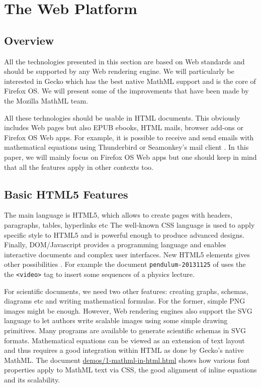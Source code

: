 \section{The Web Platform}

\subsection{Overview}

All the technologies presented in this section are based on Web standards and
should be supported by any Web rendering engine. We will particularly be
interested in Gecko which has the best native MathML support and is the core
of Firefox OS. We will present some of the improvements that have been made
by the Mozilla MathML team.

All these technologies should be usable in HTML documents. This obviously
includes Web pages but also EPUB ebooks, HTML mails, browser add-ons or
Firefox OS Web apps. For example, it is possible to receive and send emails
with mathematical equations using Thunderbird or Seamonkey's mail client
\cite{MathInEmails}.
In this paper, we will mainly
focus on Firefox OS Web apps but one should keep in mind that all the features
apply in other contexts too.

\subsection{Basic HTML5 Features}
\label{sec:basic}

The main language is HTML5, which allows to create pages with headers,
paragraphs, tables, hyperlinks etc The well-known CSS language is used to
apply specific style to HTML5 and is powerful enough to produce advanced
designs. Finally, DOM/Javascript provides a programming language and enables
interactive documents and complex user interfaces. New HTML5 elements
gives other possibilities . For example the document
{\tt pendulum-20131125} of \cite{MathInEbooks} uses the
the {\tt <video>} tag to insert some sequences of a physics lecture.

For scientific documents, we need two other features: creating graphs, schemas,
diagrams etc and writing mathematical formulas. For the former, simple PNG
images might be enough. However, Web rendering engines also support the SVG
language to let authors write scalable images using some simple drawing
primitives. Many programs are available to generate scientific schemas in SVG
formats. Mathematical equations can be viewed as an extension of text layout
and thus requires a good integration within HTML as done by
Gecko's native MathML. The document \href{http://fred-wang.github.io/MathUI2014/demos/1-mathml-in-html.html}{demos/1-mathml-in-html.html} shows how
various font properties apply to MathML text via CSS, the good alignment
of inline equations and its scalability.

